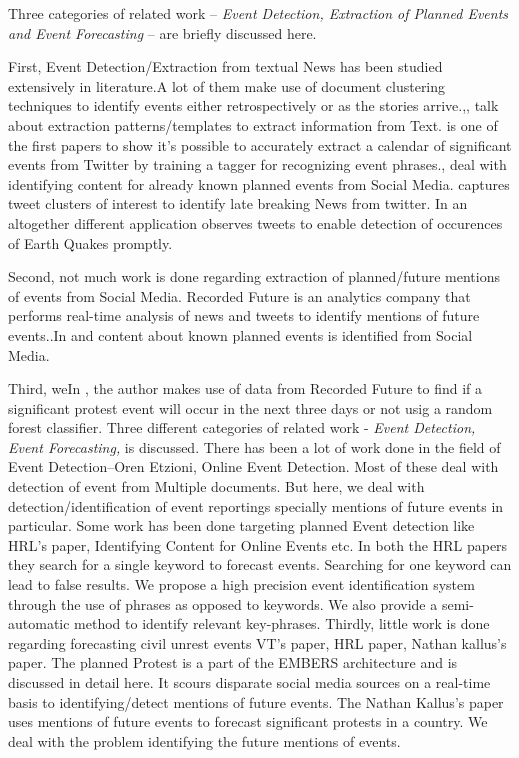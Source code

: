 Three categories of related work -- \emph{Event Detection, Extraction of Planned Events and  Event Forecasting} -- are briefly discussed here.

First, Event Detection/Extraction from textual News has been studied extensively in literature.A lot of them make use of document clustering techniques \cite{Allan:2002:TDT} \cite{Yang:1998:SRO}\cite{Gabrilovich:2004:NPP}to identify events either retrospectively or as the stories arrive.\cite{Chambers:2011:TIE},\cite{Banko07openinformation}, \cite{Riloff:2003:LEP} talk about extraction patterns/templates to extract information from Text. \cite{Ritter:2012} is one of the first papers to show it's possible to accurately extract a calendar of significant events from Twitter by training a tagger for recognizing event phrases.\cite{Becker:2012:ICP}, \cite{Becker_automaticidentification} deal with identifying content for already known planned events from Social Media.\cite{Sankaranarayanan:2009:TNT} captures tweet clusters of interest to identify late breaking News from twitter. In an altogether different application \cite{Sakaki:2010:EST} observes tweets to enable detection of occurences of Earth Quakes promptly.

Second, not much work is done regarding extraction of planned/future mentions of events from Social Media. Recorded Future\cite{recordedFuture} is an analytics company that performs real-time analysis of news and tweets to identify mentions of future events..In \cite{Becker:2012:ICP} and \cite{Becker_automaticidentification} content about known planned events is identified from Social Media.



Third, weIn \cite{DBLP:journals/corr/Kallus14}, the author makes use of data from Recorded Future to find if a  significant protest event will occur in the next three days or not usig a random forest classifier.
Three different categories of related work - \emph{Event Detection, Event Forecasting, } is discussed. There has been a lot of work done in the field of Event Detection--Oren Etzioni, Online Event Detection. Most of these deal with detection of event from Multiple documents. But here, we deal with detection/identification of event reportings specially mentions of future events in particular. Some work has been done targeting planned Event detection like HRL's paper, Identifying Content for Online Events etc. In both the HRL papers they search for a single keyword to forecast events. Searching for one keyword can lead to false results. We propose a high precision event identification system through the use of phrases as opposed to keywords. We also provide a semi-automatic method to identify relevant key-phrases. 
Thirdly, little work is done regarding forecasting civil unrest events {VT's paper, HRL paper, Nathan kallus's paper}. The planned Protest is a part of the EMBERS architecture and is discussed in detail here. It scours disparate social media sources on a real-time basis to identifying/detect mentions of future events. The Nathan Kallus's paper uses mentions of future events to forecast significant protests in a country. We deal with the problem identifying the future mentions of events.


